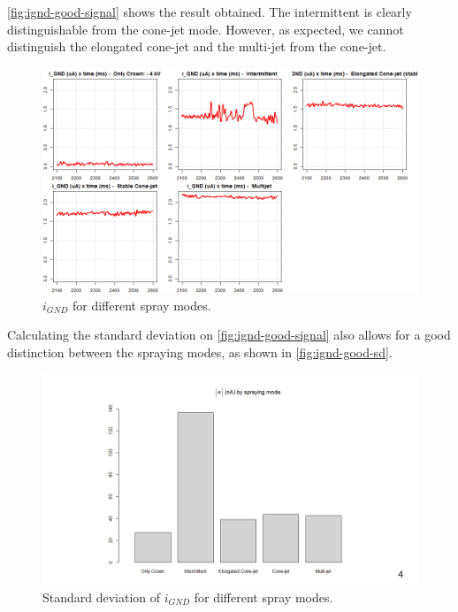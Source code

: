 \documentclass[oneside,12pt]{article}
\begin{document}
\autoref{fig:ignd-good-signal} shows the result obtained. The intermittent is clearly distinguishable from the cone-jet mode. However, 
as expected, we cannot distinguish the elongated cone-jet and the multi-jet from the cone-jet.

\begin{figure}[h!]
    \centering
    \includegraphics[width=1\textwidth,trim=1 1 1 1,clip]{figures/ignd-good-signal.png}
    \caption{$i_{GND}$ for different spray modes.}
    \label{fig:ignd-good-signal}
\end{figure}

Calculating the standard deviation on \autoref{fig:ignd-good-signal} also allows for a good distinction between the spraying modes,
as shown in \autoref{fig:ignd-good-sd}.

\begin{figure}[h!]
    \centering
    \includegraphics[width=1\textwidth,trim=1 1 1 1,clip]{figures/ignd-good-sd.png}
    \caption{Standard deviation of $i_{GND}$ for different spray modes.}
    \label{fig:ignd-good-sd}
\end{figure}
\end{document}

